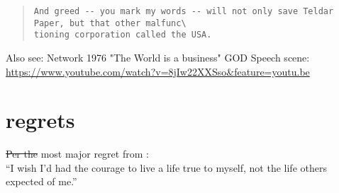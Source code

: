 \documentclass[10pt, letterpaper]{article}
\providecommand{\DIFaddtex}[1]{{\protect\color{blue}\uwave{#1}}} %
\providecommand{\DIFdeltex}[1]{{\protect\color{red}\sout{#1}}}                      %
\providecommand{\DIFaddbegin}{} %
\providecommand{\DIFaddend}{} %
\providecommand{\DIFdelbegin}{} %
\providecommand{\DIFdelend}{} %
\providecommand{\DIFadd}[1]{\texorpdfstring{\DIFaddtex{#1}}{#1}} %
\providecommand{\DIFdel}[1]{\texorpdfstring{\DIFdeltex{#1}}{}} %
\newcommand{\DIFscaledelfig}{0.5}
\newlength{\DIFdelgraphicswidth} %
\newlength{\DIFdelgraphicsheight} %
\newcommand{\DIFaddincludegraphics}[2][]{{\color{blue}\fbox{\DIFOincludegraphics[#1]{#2}}}} %
\newcommand{\DIFdelincludegraphics}[2][]{%
\sbox{\DIFdelgraphicsbox}{\DIFOincludegraphics[#1]{#2}}%
\settoboxwidth{\DIFdelgraphicswidth}{\DIFdelgraphicsbox} %
\settoboxtotalheight{\DIFdelgraphicsheight}{\DIFdelgraphicsbox} %
\scalebox{\DIFscaledelfig}{%
\parbox[b]{\DIFdelgraphicswidth}{\usebox{\DIFdelgraphicsbox}\\[-\baselineskip] \rule{\DIFdelgraphicswidth}{0em}}\llap{\resizebox{\DIFdelgraphicswidth}{\DIFdelgraphicsheight}{%
\setlength{\unitlength}{\DIFdelgraphicswidth}%
\begin{picture}(1,1)%
\thicklines\linethickness{2pt} %
{\color[rgb]{1,0,0}\put(0,0){\framebox(1,1){}}}%
{\color[rgb]{1,0,0}\put(0,0){\line( 1,1){1}}}%
{\color[rgb]{1,0,0}\put(0,1){\line(1,-1){1}}}%
\end{picture}%
}\hspace*{3pt}}} %
} %
\DeclareRobustCommand{\DIFaddbegin}{\DIFOaddbegin \let\includegraphics\DIFaddincludegraphics} %
\DeclareRobustCommand{\DIFaddend}{\DIFOaddend \let\includegraphics\DIFOincludegraphics} %
\DeclareRobustCommand{\DIFdelbegin}{\DIFOdelbegin \let\includegraphics\DIFdelincludegraphics} %
\DeclareRobustCommand{\DIFdelend}{\DIFOaddend \let\includegraphics\DIFOincludegraphics} %
\begin{document}
\begin{spacing}{1.8}
\begin{quote}
\begin{verbatim}
And greed -- you mark my words -- will not only save Teldar Paper, but that other malfunc\
tioning corporation called the USA.                                                       
\end{verbatim}
\end{quote}

Also see: 
Network 1976 "The World is a business" GOD Speech scene:
\url{https://www.youtube.com/watch?v=8jIw22XXSso&feature=youtu.be}

\section{regrets}

\DIFdelbegin \DIFdel{Per the }\DIFdelend \DIFaddbegin \DIFadd{The }\DIFaddend most major regret from \cite{ware12} \DIFaddbegin \DIFadd{is}\DIFaddend :\\

``I wish I'd had the courage to live a life true to myself, not the life others
expected of me.''\\


\end{spacing}
\end{document}
